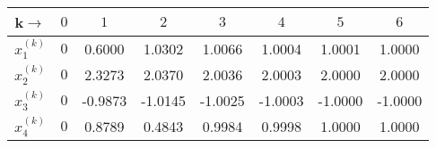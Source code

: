 \documentclass[12pt,class=book,crop=false]{standalone}
\begin{document}
\begin{center}
    \begin{tabular}{cc*{6}{S[table-format=2.4]}}
        \toprule
        k\( \rightarrow \)                   & \( 0 \)                      &  &  &  &  &  &  \\\midrule
        \( x_1^{(k)} \)\rule[-1em]{0pt}{1em} & \( 0 \)                      & 0.6000                      & 1.0302                      & 1.0066                      & 1.0004                      & 1.0001                      & 1.0000                      \\
        \( x_2^{(k)} \)                      & \rule[-1em]{0pt}{1em}\( 0 \) & 2.3273                      & 2.0370                      & 2.0036                      & 2.0003                      & 2.0000                      & 2.0000                      \\
        \( x_3^{(k)} \)\rule[-1em]{0pt}{1em} & \( 0 \)                      & -0.9873                     & -1.0145                     & -1.0025                     & -1.0003                     & -1.0000                     & -1.0000                     \\
        \( x_4^{(k)} \)\rule[-1em]{0pt}{1em} & \( 0 \)                      & 0.8789                      & 0.4843                      & 0.9984                      & 0.9998                      & 1.0000                      & 1.0000                      \\\bottomrule
    \end{tabular}
\end{center}
\end{document}
